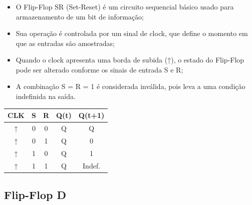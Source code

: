 \documentclass{beamer}
\begin{document}
\begin{frame}
    \frametitle{\insertsubsection}
    \scriptsize
    \begin{itemize}
        \item O Flip-Flop SR (Set-Reset) é um circuito sequencial básico usado para armazenamento de um bit de informação;
        \item Sua operação é controlada por um sinal de clock, que define o momento em que as entradas são amostradas;
        \item Quando o clock apresenta uma borda de subida (↑), o estado do Flip-Flop pode ser alterado conforme os sinais de entrada S e R;
        \item A combinação S = R = 1 é considerada inválida, pois leva a uma condição indefinida na saída.
    \end{itemize}

    \vspace{0.5em}
    \centering
    \begin{tabular}{|c|c|c|c|c|}
        \hline
        CLK & S & R & Q(t) & Q(t+1) \\
        \hline
        ↑ & 0 & 0 & Q     & Q \\
        ↑ & 0 & 1 & Q     & 0 \\
        ↑ & 1 & 0 & Q     & 1 \\
        ↑ & 1 & 1 & Q     & Indef. \\
        \hline
    \end{tabular}
  
\end{frame}

\subsection{Flip-Flop D}
\end{document}
